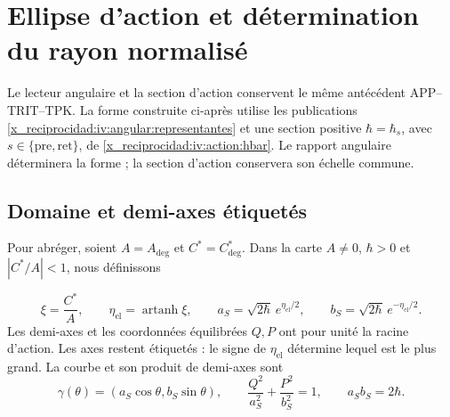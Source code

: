 \section{Ellipse d’action et détermination du rayon normalisé}
\label{x_reciprocidad:iv:ellipse:section}

Le lecteur angulaire et la section d’action conservent le même
antécédent APP--TRIT--TPK. La forme construite
ci-après utilise les publications
\eqref{x_reciprocidad:iv:angular:representantes} et une section positive
\(\hbar=\hbar_s\), avec
\(s\in\{\mathrm{pre},\mathrm{ret}\}\), de
\eqref{x_reciprocidad:iv:action:hbar}. Le rapport angulaire déterminera la forme ;
la section d’action conservera son échelle commune.

\subsection{Domaine et demi-axes étiquetés}
\label{x_reciprocidad:iv:ellipse:dominio}

Pour abréger, soient \(A=A_{\deg}\) et \(C^*=C^*_{\deg}\).
Dans la carte \(A\ne0\), \(\hbar>0\) et \(|C^*/A|<1\),
nous définissons

\begin{equation}
 \xi=\frac{C^*}{A},\qquad
 \eta_{\mathrm{el}}=\operatorname{artanh}\xi,\qquad
 a_S=\sqrt{2\hbar}\,e^{\eta_{\mathrm{el}}/2},\qquad
 b_S=\sqrt{2\hbar}\,e^{-\eta_{\mathrm{el}}/2}.
 \label{x_reciprocidad:iv:ellipse:semiejes}
\end{equation}
Les demi-axes et les coordonnées équilibrées \(Q,P\) ont pour
unité la racine d’action. Les axes restent étiquetés :
le signe de \(\eta_{\mathrm{el}}\) détermine lequel est le
plus grand. La courbe et son produit de demi-axes sont
\begin{equation}
 \gamma(\theta)=(a_S\cos\theta,b_S\sin\theta),\qquad
 \frac{Q^2}{a_S^2}+\frac{P^2}{b_S^2}=1,\qquad
 a_Sb_S=2\hbar.
 \label{x_reciprocidad:iv:ellipse:curva}
\end{equation}

